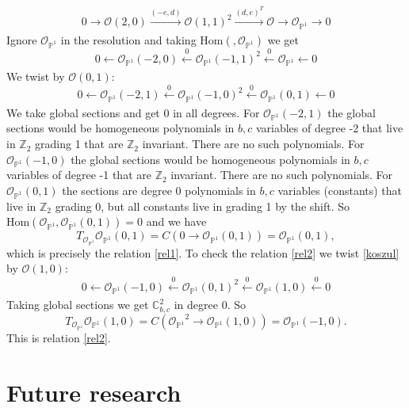 \documentclass[oneside]{amsart}
\theoremstyle{definition}
\theoremstyle{definition}
\theoremstyle{definition}
\theoremstyle{definition}
\newcommand{\CC}{\mathbb{C}}
\newcommand{\PP}{\mathbb{P}}
\newcommand{\Z}{\mathbb{Z}}
\newcommand{\Os}{\mathcal{O}}
\begin{document}
\begin{equation*}
0 \xrightarrow[]{} \Os(2,0) \xrightarrow[]{(-e,d)} \Os(1,1)^2\xrightarrow[]{(d,e)^T} \Os \xrightarrow[]{} \Os_{\PP^1} \xrightarrow[] {}0
\end{equation*}
Ignore $\Os_{\PP^1}$ in the resolution and taking $\text{Hom}(, \Os_{\PP^1})$ we get
\begin{equation}
\label{koszul}
0 \xleftarrow[]{} \Os_{\PP^1}(-2,0) \xleftarrow[]{0} \Os_{\PP^1}(-1,1)^2\xleftarrow[]{0} \Os_{\PP^1} \xleftarrow[]{} 0
\end{equation}
We twist by $\Os(0,1)$:
$$
0 \xleftarrow[]{} \Os_{\PP^1}(-2,1) \xleftarrow[]{0} \Os_{\PP^1}(-1,0)^2\xleftarrow[]{0} \Os_{\PP^1}(0,1) \xleftarrow[]{}0
$$
We take global sections and get 0 in all degrees. For $\Os_{\PP^1}(-2,1)$ the global sections would be homogeneous polynomials in $b,c$ variables of degree -2 that live in $\Z_2$ grading 1 that are $\Z_2$ invariant. There are no such polynomials. For $\Os_{\PP^1}(-1,0)$ the global sections would be homogeneous polynomials in $b,c$ variables of degree -1 that are $\Z_2$ invariant. There are no such polynomials. For $\Os_{\PP^1}(0,1)$ the sections are degree 0 polynomials in $b,c$ variables (constants) that live in $\Z_2$ grading 0, but all constants live in grading 1 by the shift.
So $\text{Hom}\left(\Os_{\PP^1},\Os_{\PP^1}(0,1)\right) = 0$ and we have
$$
T_{\Os_{\PP^1}}\Os_{\PP^1}(0,1) = C(0 \to \Os_{\PP^1}(0,1)) =\Os_{\PP^1}(0,1),
$$
which is precisely the relation \eqref{rel1}. To check the relation \eqref{rel2} we twist \eqref{koszul} by $\Os(1,0)$:
\begin{equation*}
0 \xleftarrow[]{} \Os_{\PP^1}(-1,0) \xleftarrow[]{0} \Os_{\PP^1}(0,1)^2\xleftarrow[]{0} \Os_{\PP^1}(1,0) \xleftarrow[]{0} 0
\end{equation*}
Taking global sections we get $\CC^2_{b,c}$ in degree 0. So
$$
T_{\Os_{\PP^1}}\Os_{\PP^1}(1,0) = C({\Os_{\PP^1}}^2 \to \Os_{\PP^1}(1,0)) =\Os_{\PP^1}(-1,0).
$$
This is relation \eqref{rel2}.

\section{Future research}



\end{document}
